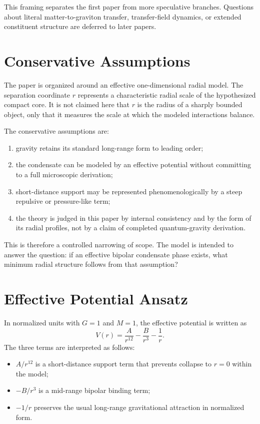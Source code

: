 \documentclass[11pt]{article}
\begin{document}
This framing separates the first paper from more speculative branches. Questions about literal matter-to-graviton transfer, transfer-field dynamics, or extended constituent structure are deferred to later papers.

\section{Conservative Assumptions}
The paper is organized around an effective one-dimensional radial model. The separation coordinate $r$ represents a characteristic radial scale of the hypothesized compact core. It is not claimed here that $r$ is the radius of a sharply bounded object, only that it measures the scale at which the modeled interactions balance.

The conservative assumptions are:
\begin{enumerate}[leftmargin=1.4em]
  \item gravity retains its standard long-range form to leading order;
  \item the condensate can be modeled by an effective potential without committing to a full microscopic derivation;
  \item short-distance support may be represented phenomenologically by a steep repulsive or pressure-like term;
  \item the theory is judged in this paper by internal consistency and by the form of its radial profiles, not by a claim of completed quantum-gravity derivation.
\end{enumerate}

This is therefore a controlled narrowing of scope. The model is intended to answer the question: if an effective bipolar condensate phase exists, what minimum radial structure follows from that assumption?

\section{Effective Potential Ansatz}
In normalized units with $G=1$ and $M=1$, the effective potential is written as
\[
V(r) = \frac{A}{r^{12}} - \frac{B}{r^3} - \frac{1}{r}.
\]
The three terms are interpreted as follows:
\begin{itemize}[leftmargin=1.25em]
  \item $A/r^{12}$ is a short-distance support term that prevents collapse to $r=0$ within the model;
  \item $-B/r^3$ is a mid-range bipolar binding term;
  \item $-1/r$ preserves the usual long-range gravitational attraction in normalized form.
\end{itemize}
\end{document}
